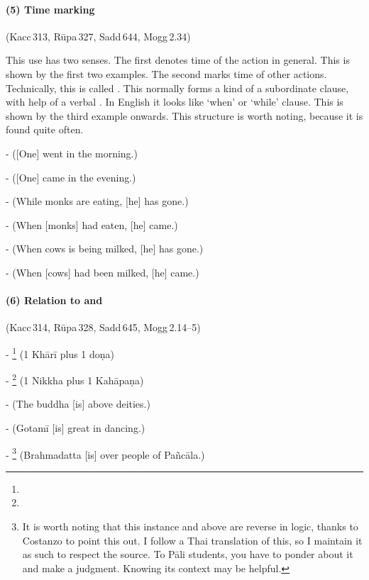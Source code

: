 \paragraph*{(5) Time marking} (Kacc\,313, R\=upa\,327, Sadd\,644, Mogg\,2.34)\par
This use has two senses. The first denotes time of the action in general. This is shown by the first two examples. The second marks time of other actions. Technically, this is called . This normally forms a kind of a subordinate clause, with help of a verbal . In English it looks like `when' or `while' clause. This is shown by the third example onwards. This structure is worth noting, because it is found quite often.\par
-  ([One] went in the morning.)\par
-  ([One] came in the evening.)\par
-  (While monks are eating, [he] has gone.)\par
-  (When [monks] had eaten, [he] came.)\par
-  (When cows is being milked, [he] has gone.)\par
-  (When [cows] had been milked, [he] came.)\par

\paragraph*{(6) Relation to  and } (Kacc\,314, R\=upa\,328, Sadd\,645, Mogg\,2.14--5)\par
- \footnote{} (1 Kh\=ar\=i plus 1 do\d na)\par
- \footnote{} (1 Nikkha plus 1 Kah\=apa\d na)\par
-  (The buddha [is] above deities.)\par
-  (Gotam\=i [is] great in dancing.)\par
- \footnote{ It is worth noting that this instance and  above are reverse in logic, thanks to Costanzo to point this out. I follow a Thai translation of this, so I maintain it as such to respect the source. To P\=ali students, you have to ponder about it and make a judgment. Knowing its context may be helpful.} (Brahmadatta [is] over people of Pa\~nc\=ala.)\par

